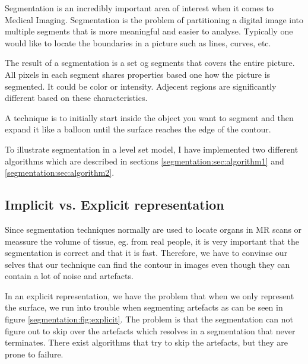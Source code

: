 
Segmentation is an incredibly important area of interest when it comes to Medical Imaging. Segmentation is the problem of partitioning a digital image into multiple segments that is more meaningful and easier to analyse. Typically one would like to locate the boundaries in a picture such as lines, curves, etc.

The result of a segmentation is a set og segments that covers the entire picture. All pixels in each segment shares properties based one how the picture is segmented. It could be color or intensity. Adjecent regions are significantly different based on these characteristics.

A technique is to initially start inside the object you want to segment and then expand it like a balloon until the surface reaches the edge of the contour.

To illustrate segmentation in a level set model, I have implemented two different algorithms which are described in sections \ref{segmentation:sec:algorithm1} and \ref{segmentation:sec:algorithm2}.

\subsection{Implicit vs. Explicit representation}

Since segmentation techniques normally are used to locate organs in MR scans or meassure the volume of tissue, eg. from real people, it is very important that the segmentation is correct and that it is fast. Therefore, we have to convinse our selves that our technique can find the contour in images even though they can contain a lot of noise and artefacts. 

In an explicit representation, we have the problem that when we only represent the surface, we run into trouble when segmenting artefacts as can be seen in figure \ref{segmentation:fig:explicit}. The problem is that the segmentation can not figure out to skip over the artefacts which resolves in a segmentation that never terminates. There exist algorithms that try to skip the artefacts, but they are prone to failure.


